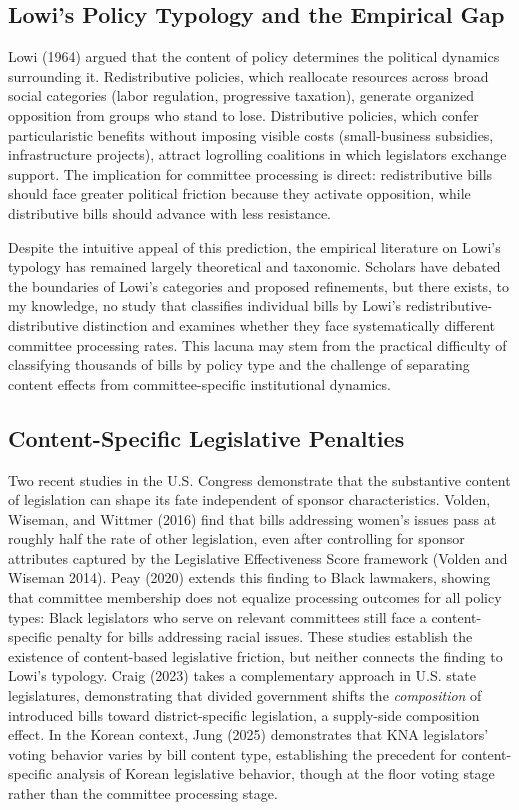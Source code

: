 \documentclass[11pt]{article}
\begin{document}
\subsection{Lowi's Policy Typology and the Empirical Gap}

Lowi (1964) argued that the content of policy determines the political dynamics surrounding it. Redistributive policies, which reallocate resources across broad social categories (labor regulation, progressive taxation), generate organized opposition from groups who stand to lose. Distributive policies, which confer particularistic benefits without imposing visible costs (small-business subsidies, infrastructure projects), attract logrolling coalitions in which legislators exchange support. The implication for committee processing is direct: redistributive bills should face greater political friction because they activate opposition, while distributive bills should advance with less resistance.

Despite the intuitive appeal of this prediction, the empirical literature on Lowi's typology has remained largely theoretical and taxonomic. Scholars have debated the boundaries of Lowi's categories and proposed refinements, but there exists, to my knowledge, no study that classifies individual bills by Lowi's redistributive-distributive distinction and examines whether they face systematically different committee processing rates. This lacuna may stem from the practical difficulty of classifying thousands of bills by policy type and the challenge of separating content effects from committee-specific institutional dynamics.

\subsection{Content-Specific Legislative Penalties}

Two recent studies in the U.S. Congress demonstrate that the substantive content of legislation can shape its fate independent of sponsor characteristics. Volden, Wiseman, and Wittmer (2016) find that bills addressing women's issues pass at roughly half the rate of other legislation, even after controlling for sponsor attributes captured by the Legislative Effectiveness Score framework (Volden and Wiseman 2014). Peay (2020) extends this finding to Black lawmakers, showing that committee membership does not equalize processing outcomes for all policy types: Black legislators who serve on relevant committees still face a content-specific penalty for bills addressing racial issues. These studies establish the existence of content-based legislative friction, but neither connects the finding to Lowi's typology. Craig (2023) takes a complementary approach in U.S. state legislatures, demonstrating that divided government shifts the \emph{composition} of introduced bills toward district-specific legislation, a supply-side composition effect. In the Korean context, Jung (2025) demonstrates that KNA legislators' voting behavior varies by bill content type, establishing the precedent for content-specific analysis of Korean legislative behavior, though at the floor voting stage rather than the committee processing stage.
\end{document}
